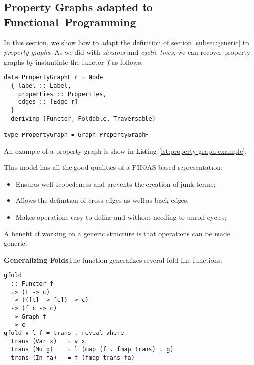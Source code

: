 \subsection{Property Graphs adapted to \mbox{Functional Programming}}
\label{subsec:adapting}

In this section, we show how to adapt the definition of section \ref{subsec:generic} to \emph{property graphs}. As we did with \emph{streams} and \emph{cyclic trees}, we can recover
property graphs by instantiate the functor $f$ as follows:

\vspace{1mm}
\begin{verbatim}
data PropertyGraphF r = Node
  { label :: Label,
    properties :: Properties,
    edges :: [Edge r]
  }
  deriving (Functor, Foldable, Traversable)

type PropertyGraph = Graph PropertyGraphF
\end{verbatim}
\vspace{1mm}

An example of a property graph is show in Listing \ref{lst:property-graph-example}.

This model has all the good qualities of a PHOAS-based representation:

\begin{itemize}
  \item Ensures well-scopedeness and prevents the creation of junk terms;
  \item Allows the definition of cross edges as well as back edges;
  \item Makes operations easy to define and without needing to unroll cycles;
\end{itemize}

A benefit of working on a generic structure is that operations can be made generic.

\textbf{Generalizing Folds}\quad The function  generalizes several fold-like functions:

\vspace{1mm}
\begin{verbatim}
gfold
  :: Functor f
  => (t -> c)
  -> (([t] -> [c]) -> c)
  -> (f c -> c)
  -> Graph f
  -> c
gfold v l f = trans . reveal where
  trans (Var x)   = v x
  trans (Mu g)    = l (map (f . fmap trans) . g)
  trans (In fa)   = f (fmap trans fa)
\end{verbatim}
\vspace{1mm}

